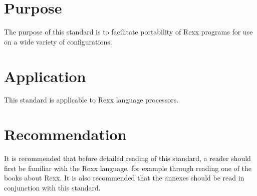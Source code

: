 \section{Purpose}\label{purpose}

The purpose of this standard is to facilitate portability of Rexx
programs for use on a wide variety of configurations.

\section{Application}\label{application}

This standard is applicable to Rexx language processors.

\section{Recommendation}\label{recommendation}

It is recommended that before detailed reading of this standard, a
reader should first be familiar with the Rexx language, for example
through reading one of the books about Rexx. It is also recommended that
the annexes should be read in conjunction with this standard.
